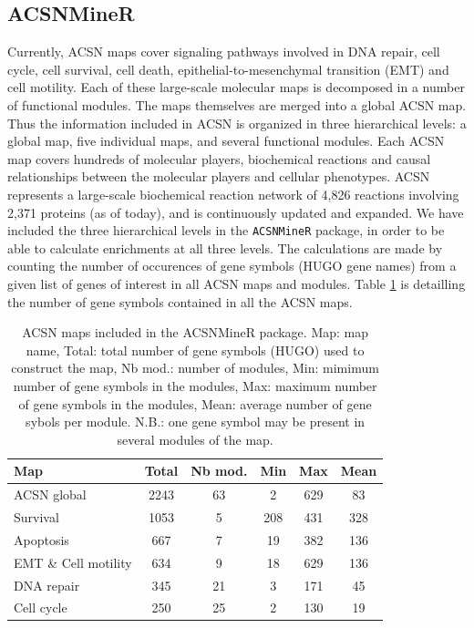 \documentclass{article}
\begin{document}
\subsection{ACSNMineR}
Currently, ACSN maps cover signaling pathways involved in DNA repair, cell
cycle, cell survival, cell death, epithelial-to-mesenchymal transition (EMT) and
cell motility. Each of these large-scale molecular maps is decomposed in a number
of functional modules. The maps themselves are merged into a global ACSN map.
Thus the information included in ACSN is organized in three hierarchical levels:
a global map, five individual maps, and several functional modules. Each
ACSN map covers hundreds of molecular players, biochemical reactions and causal
relationships between the molecular players and cellular phenotypes.  ACSN
represents a large-scale biochemical reaction network of 4,826 reactions
involving 2,371 proteins (as of today), and is continuously updated and expanded.  We have
included the three hierarchical levels in the \verb|ACSNMineR| package, in order
to be able to calculate enrichments at all three levels. The calculations are
made by counting the number of occurences of gene symbols (HUGO gene names) from
a given list of genes of interest in all ACSN maps and modules. Table
\ref{tab:table1} is detailling the number of gene symbols contained in all the ACSN
maps.


\begin{table}[h!]
 \centering
  \caption{ACSN maps included in the ACSNMineR package. Map: map name,
  Total: total number of gene symbols (HUGO) used to construct the map, Nb
  mod.: number of modules, Min: mimimum number of gene symbols in the modules,
  Max: maximum number of gene symbols in the modules, Mean: average number of
  gene sybols per module. N.B.: one gene symbol may be present in several
  modules of the map.} 
  \label{tab:table1}
  \begin{tabular}{lccccc}
    \hline
    Map & Total & Nb mod. & Min & Max & Mean\\
    \hline
  ACSN global & 2243 & 63 & 2 &629& 83\\
  Survival  &1053&5  &208 &431 &328\\
  Apoptosis & 667&7 & 19& 382& 136\\
  EMT \& Cell motility &634 &9  &18 &629 &136\\
  DNA repair &345&21  &3 &171  &45\\
  Cell cycle &250&25  &2 &130  &19\\
  \hline

  \end{tabular}

\end{table}
\end{document}
